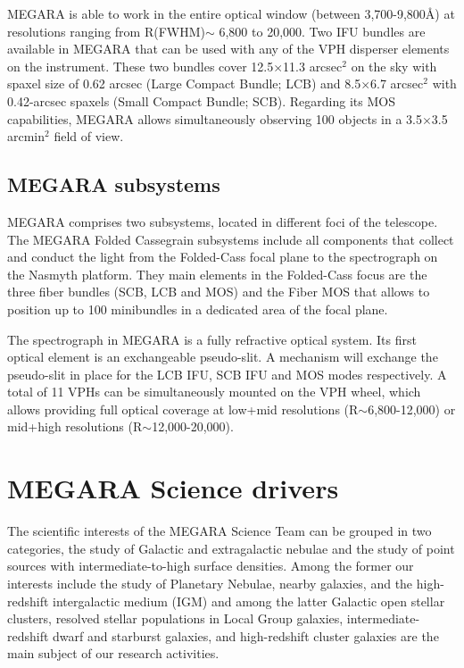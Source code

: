 MEGARA is able to work in the entire optical window (between 3,700-9,800\AA) at resolutions ranging from R(FWHM)$\sim$ 6,800 to 20,000. Two
IFU bundles are available in MEGARA that can be used with any of the VPH disperser elements on the instrument. These two bundles cover 12.5$\times$11.3 arcsec$^2$ on the sky with spaxel size of 0.62 arcsec (Large Compact
Bundle; LCB) and 8.5$\times$6.7 arcsec$^2$ with 0.42-arcsec spaxels (Small Compact Bundle; SCB). Regarding its MOS
capabilities, MEGARA allows simultaneously observing 100 objects in a 3.5$\times$3.5 arcmin$^2$ field of view. 

\subsection{MEGARA subsystems}
MEGARA comprises two subsystems, located in different foci of the
telescope. The MEGARA Folded Cassegrain subsystems include all components that collect and conduct the light from
the Folded-Cass focal plane to the spectrograph on the Nasmyth platform. 
They main elements in the Folded-Cass focus are the three fiber bundles (SCB, LCB and MOS) and the Fiber MOS that allows to position up to 100 minibundles in a dedicated area of the focal plane.

The spectrograph in MEGARA is a fully refractive optical system. Its first optical element is an exchangeable pseudo-slit. A mechanism will exchange the pseudo-slit in place for the LCB IFU, SCB IFU and MOS modes respectively. A total of 11 VPHs can be simultaneously mounted on the
VPH wheel, which allows providing full optical coverage at low+mid resolutions (R$\sim$6,800-12,000) or mid+high
resolutions (R$\sim$12,000-20,000).

\section{MEGARA Science drivers}
The scientific interests of the MEGARA Science Team
can be grouped in two categories, the study of Galactic and extragalactic nebulae and the study of
point sources with intermediate-to-high surface densities. Among the former our interests include the study of Planetary Nebulae, nearby galaxies, and the high-redshift intergalactic medium
(IGM) and among the latter Galactic open stellar clusters, resolved stellar populations in Local Group galaxies,
intermediate-redshift dwarf and starburst galaxies, and high-redshift cluster galaxies are the main subject of
our research activities. 


